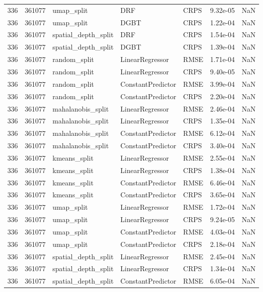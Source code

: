 \begin{tabular}{rrlllrr}
336 & 361077 & umap\_split & DRF & CRPS & 9.32e-05 & NaN \\
336 & 361077 & umap\_split & DGBT & CRPS & 1.22e-04 & NaN \\
336 & 361077 & spatial\_depth\_split & DRF & CRPS & 1.54e-04 & NaN \\
336 & 361077 & spatial\_depth\_split & DGBT & CRPS & 1.39e-04 & NaN \\
336 & 361077 & random\_split & LinearRegressor & RMSE & 1.71e-04 & NaN \\
336 & 361077 & random\_split & LinearRegressor & CRPS & 9.40e-05 & NaN \\
336 & 361077 & random\_split & ConstantPredictor & RMSE & 3.99e-04 & NaN \\
336 & 361077 & random\_split & ConstantPredictor & CRPS & 2.20e-04 & NaN \\
336 & 361077 & mahalanobis\_split & LinearRegressor & RMSE & 2.46e-04 & NaN \\
336 & 361077 & mahalanobis\_split & LinearRegressor & CRPS & 1.35e-04 & NaN \\
336 & 361077 & mahalanobis\_split & ConstantPredictor & RMSE & 6.12e-04 & NaN \\
336 & 361077 & mahalanobis\_split & ConstantPredictor & CRPS & 3.40e-04 & NaN \\
336 & 361077 & kmeans\_split & LinearRegressor & RMSE & 2.55e-04 & NaN \\
336 & 361077 & kmeans\_split & LinearRegressor & CRPS & 1.38e-04 & NaN \\
336 & 361077 & kmeans\_split & ConstantPredictor & RMSE & 6.46e-04 & NaN \\
336 & 361077 & kmeans\_split & ConstantPredictor & CRPS & 3.65e-04 & NaN \\
336 & 361077 & umap\_split & LinearRegressor & RMSE & 1.72e-04 & NaN \\
336 & 361077 & umap\_split & LinearRegressor & CRPS & 9.24e-05 & NaN \\
336 & 361077 & umap\_split & ConstantPredictor & RMSE & 4.03e-04 & NaN \\
336 & 361077 & umap\_split & ConstantPredictor & CRPS & 2.18e-04 & NaN \\
336 & 361077 & spatial\_depth\_split & LinearRegressor & RMSE & 2.45e-04 & NaN \\
336 & 361077 & spatial\_depth\_split & LinearRegressor & CRPS & 1.34e-04 & NaN \\
336 & 361077 & spatial\_depth\_split & ConstantPredictor & RMSE & 6.05e-04 & NaN \\

\end{tabular}
